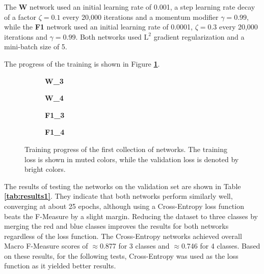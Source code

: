 The \textbf{W} network used an initial learning rate of 0.001, a step learning rate decay of a factor $\zeta = 0.1$ every 20,000 iterations and a momentum modifier $\gamma = 0.99$, while the \textbf{F1} network used an initial learning rate of 0.0001, $\zeta = 0.3$ every 20,000 iterations and $\gamma = 0.99$. Both networks used $\text{L}^2$ gradient regularization and a mini-batch size of 5.

The progress of the training is shown in Figure \textbf{\ref{fig:weighted_f1_training}}.\\

\begin {figure}[!htb]
	\begin {subfigure}[b]{0.4\linewidth}
		\scalebox{0.65}{}
		\caption{\textbf{W\_3}}
	\end {subfigure}\hspace{1.75cm}
	\begin {subfigure}[b]{0.4\linewidth}
		\scalebox{0.65}{}
		\caption{\textbf{W\_4}}
	\end {subfigure}

	\begin {subfigure}[b]{0.4\linewidth}
		\scalebox{0.65}{}
		\caption{\textbf{F1\_3}}
	\end {subfigure}\hspace{1.75cm}
	\begin {subfigure}[b]{0.4\linewidth}
		\scalebox{0.65}{}
		\caption{\textbf{F1\_4}}
	\end {subfigure}

		\caption[Training progress of the first collection of networks.]{Training progress of the first collection of networks. The training loss is shown in muted colors, while the validation loss is denoted by bright colors.}
		\label{fig:weighted_f1_training}
\end {figure}

\noindent The results of testing the networks on the validation set are shown in Table \textbf{\ref{tab:results1}}. They indicate that both networks perform similarly well, converging at about 25 epochs, although using a Cross-Entropy loss function beats the F-Measure by a slight margin. Reducing the dataset to three classes by merging the red and blue classes improves the results for both networks regardless of the loss function. The Cross-Entropy networks achieved overall Macro F-Measure scores of $\approx$0.877 for 3 classes and $\approx$0.746 for 4 classes. Based on these results, for the following tests, Cross-Entropy was used as the loss function as it yielded better results.\\ 

